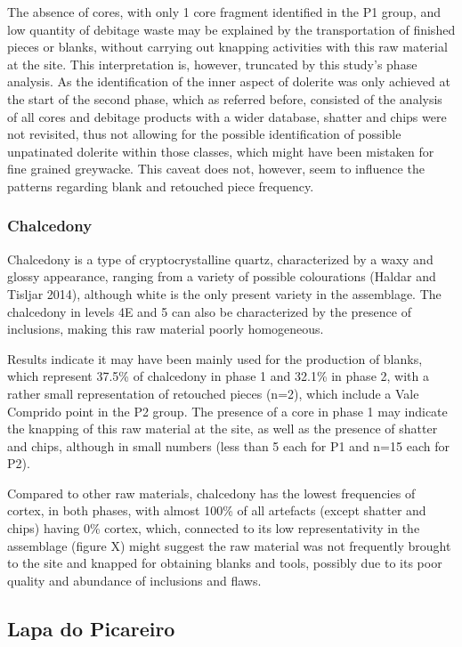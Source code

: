 \documentclass[12pt,twoside]{reedthesis}
\begin{document}
The absence of cores, with only 1 core fragment identified in the P1 group, and low quantity of debitage waste may be explained by the transportation of finished pieces or blanks, without carrying out knapping activities with this raw material at the site. This interpretation is, however, truncated by this study's phase analysis. As the identification of the inner aspect of dolerite was only achieved at the start of the second phase, which as referred before, consisted of the analysis of all cores and debitage products with a wider database, shatter and chips were not revisited, thus not allowing for the possible identification of possible unpatinated dolerite within those classes, which might have been mistaken for fine grained greywacke. This caveat does not, however, seem to influence the patterns regarding blank and retouched piece frequency.

\hypertarget{chalcedony}{%
\subsubsection{Chalcedony}\label{chalcedony}}

Chalcedony is a type of cryptocrystalline quartz, characterized by a waxy and glossy appearance, ranging from a variety of possible colourations (Haldar and Tisljar 2014), although white is the only present variety in the assemblage. The chalcedony in levels 4E and 5 can also be characterized by the presence of inclusions, making this raw material poorly homogeneous.

Results indicate it may have been mainly used for the production of blanks, which represent 37.5\% of chalcedony in phase 1 and 32.1\% in phase 2, with a rather small representation of retouched pieces (n=2), which include a Vale Comprido point in the P2 group. The presence of a core in phase 1 may indicate the knapping of this raw material at the site, as well as the presence of shatter and chips, although in small numbers (less than 5 each for P1 and n=15 each for P2).

Compared to other raw materials, chalcedony has the lowest frequencies of cortex, in both phases, with almost 100\% of all artefacts (except shatter and chips) having 0\% cortex, which, connected to its low representativity in the assemblage (figure X) might suggest the raw material was not frequently brought to the site and knapped for obtaining blanks and tools, possibly due to its poor quality and abundance of inclusions and flaws.

\hypertarget{lapa-do-picareiro-1}{%
\subsection{Lapa do Picareiro}\label{lapa-do-picareiro-1}}
\end{document}
